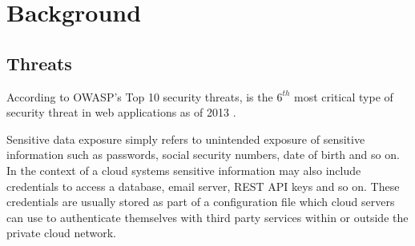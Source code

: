 \documentclass{sig-alternate-05-2015}
\begin{document}
\section{Background}
% 
% 
% 
% 
% 

\subsection{Threats}

According to OWASP's Top 10 security threats,  is the $6^{th}$ most critical type of security threat in web applications as of 2013 \cite{wichers_owasp_2014}. 

Sensitive data exposure simply refers to unintended exposure of sensitive information such as passwords, social security numbers, date of birth and so on. In the context of a cloud systems sensitive information may also include credentials to access a database, email server, REST API keys and so on. These credentials are usually stored as part of a configuration file which cloud servers can use to authenticate themselves with third party services within or outside the private cloud network. 
\end{document}
